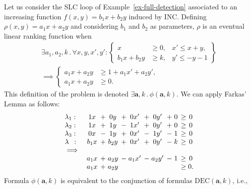 \documentclass{acm_proc_article-sp}
\newcommand{\st}{\mathrel{.}}
\newcommand{\itc}{\mathrel{:}}
\newcommand{\dec}{\mathrm{DEC}}
\newcommand{\inc}{\mathrm{INC}}
\begin{document}
Let us consider the SLC loop of Example~\ref{ex-full-detection}
associated to an increasing function $f(x, y) = b_1 x + b_2 y$
induced by $\inc$.
Defining $\rho(x, y) = a_1 x + a_2 y$ and
considering $b_1$ and $b_2$ as parameters,
$\rho$ is an eventual linear ranking function when
\begin{multline*}
  \exists a_1, a_2, k  \st \forall x, y, x', y' \itc
    \left\{
      \begin{aligned}
         x &\ge 0, & x' \le x + y, \\
         b_1 x + b_2 y &\ge k, & y' \le -y - 1
       \end{aligned}
    \right\} \\
      \implies
        \left\{
          \begin{aligned}
            a_1 x + a_2 y &\ge 1 + a_1 x' + a_2 y', \\
            a_1 x + a_2 y &\ge 0.
          \end{aligned}
        \right.
\end{multline*}
This definition of the problem is denoted $\exists \mathbf{a}, k \st \phi(\mathbf{a}, k)$.
We can apply Farkas' Lemma as follows:
\[
  \begin{array}{lc@{\hspace{1ex}}c@{\;}c@{\hspace{1ex}}c@{\;}c@{\hspace{1ex}}c@{\;}c@{\hspace{1ex}}c@{\;}c@{\hspace{1ex}}c@{\;}c@{\hspace{1ex}}}
    \lambda_1: & 1x & + & 0y & + & 0x' & + & 0y' & + & 0 & \ge & 0 \\
    \lambda_2: & 1x & + & 1y & - & 1x' & + & 0y' & + & 0 & \ge & 0 \\
    \lambda_3: & 0x & - & 1y & + & 0x' & - & 1y' & - & 1 & \ge & 0 \\
    \lambda \, \, \, : & b_1 x & + & b_2 y & + & 0x' & + & 0y' & - & k & \ge & 0 \\
    \implies \\
               & a_1 x & + & a_2y & - & a_1 x' & - & a_2 y' & - & 1 & \ge & 0 \\
               & a_1 x & + & a_2y &   &     &   &     &   &   & \ge & 0.
  \end{array}
\]
Formula $\phi(\mathbf{a}, k)$ is equivalent to the conjunction
of formulas $\dec(\mathbf{a}, k)$, i.e.,
\end{document}
